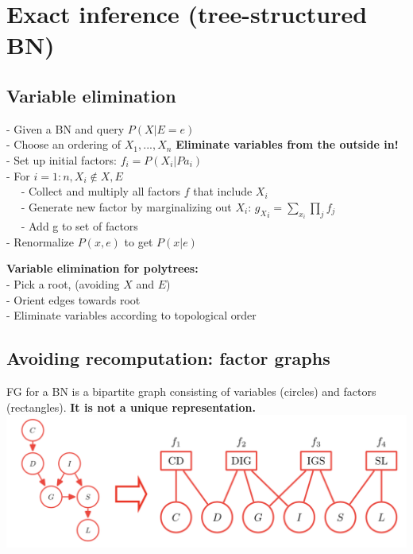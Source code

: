 \section{Exact inference (tree-structured BN) }
\subsection{Variable elimination}
- Given a BN and query $P(X|E=e)$\\
- Choose an ordering of $X_1, ..., X_n$ \textbf{Eliminate variables from the outside in!}\\
- Set up initial factors: $f_i=P(X_i|Pa_i)$\\
- For $i=1:n, X_i \notin {X, E}$\\
$\quad$ - Collect and multiply all factors $f$ that include $X_i$\\
$\quad$ - Generate new factor by marginalizing out $X_i$:
        ${g_X}_i = \sum_{x_i}\prod_j f_j$\\
$\quad$ - Add g to set of factors\\
- Renormalize $P(x,e)$ to get $P(x|e)$

\textbf{Variable elimination for polytrees:}\\
- Pick a root, (avoiding $X$ and $E$)\\
- Orient edges towards root\\
- Eliminate variables according to topological order


\subsection{Avoiding recomputation: factor graphs}
FG for a BN is a bipartite graph consisting of variables (circles) and factors (rectangles). \textbf{It is not a unique representation.}\\
\includegraphics[scale=0.25]{images/factor_graph.png}
